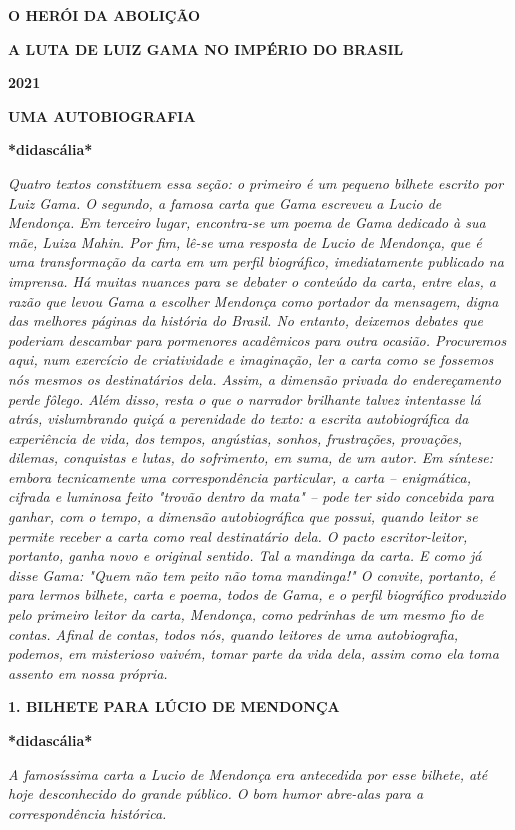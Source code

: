 \textbf{O HERÓI DA ABOLIÇÃO}

\textbf{A LUTA DE LUIZ GAMA NO IMPÉRIO DO BRASIL}

\textbf{2021}

\textbf{UMA AUTOBIOGRAFIA}

\textbf{*didascália*}

\emph{Quatro textos constituem essa seção: o primeiro é um pequeno
bilhete escrito por Luiz Gama. O segundo, a famosa carta que Gama
escreveu a Lucio de Mendonça. Em terceiro lugar, encontra-se um poema de
Gama dedicado à sua mãe, Luiza Mahin. Por fim, lê-se uma resposta de
Lucio de Mendonça, que é uma transformação da carta em um perfil
biográfico, imediatamente publicado na imprensa. Há muitas nuances para
se debater o conteúdo da carta, entre elas, a razão que levou Gama a
escolher Mendonça como portador da mensagem, digna das melhores páginas
da história do Brasil. No entanto, deixemos debates que poderiam
descambar para pormenores acadêmicos para outra ocasião. Procuremos
aqui, num exercício de criatividade e imaginação, ler a carta como se
fossemos nós mesmos os destinatários dela. Assim, a dimensão privada do
endereçamento perde fôlego. Além disso, resta o que o narrador brilhante
talvez intentasse lá atrás, vislumbrando quiçá a perenidade do texto: a
escrita autobiográfica da experiência de vida, dos tempos, angústias,
sonhos, frustrações, provações, dilemas, conquistas e lutas, do
sofrimento, em suma, de um autor. Em síntese: embora tecnicamente uma
correspondência particular, a carta -- enigmática, cifrada e luminosa
feito "trovão dentro da mata" -- pode ter sido concebida para ganhar,
com o tempo, a dimensão autobiográfica que possui, quando leitor se
permite receber a carta como real destinatário dela. O pacto
escritor-leitor, portanto, ganha novo e original sentido. Tal a mandinga
da carta. E como já disse Gama: "Quem não tem peito não toma mandinga!"
O convite, portanto, é para lermos bilhete, carta e poema, todos de
Gama, e o perfil biográfico produzido pelo primeiro leitor da carta,
Mendonça, como pedrinhas de um mesmo fio de contas. Afinal de contas,
todos nós, quando leitores de uma autobiografia, podemos, em misterioso
vaivém, tomar parte da vida dela, assim como ela toma assento em nossa
própria.}

\textbf{1. BILHETE PARA LÚCIO DE MENDONÇA}

\textbf{*didascália*}

\emph{A famosíssima carta a Lucio de Mendonça era antecedida por esse
bilhete, até hoje desconhecido do grande público. O bom humor abre-alas
para a correspondência histórica. }

